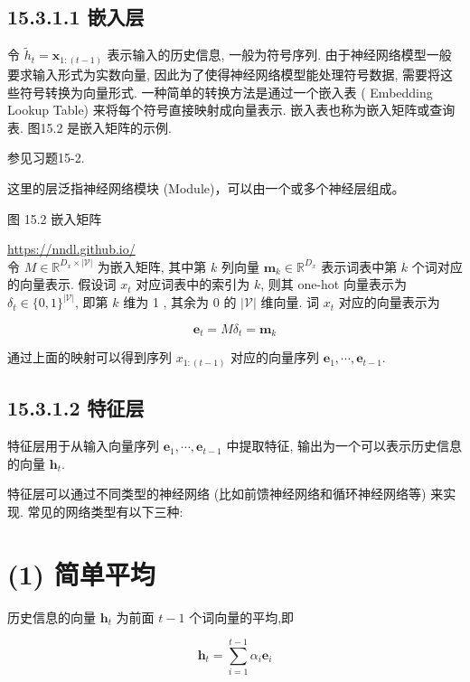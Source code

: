 \documentclass[10pt]{article}
\begin{document}
\subsection*{15.3.1.1 嵌入层}
令 $\tilde{h}_{t}=\boldsymbol{x}_{1:(t-1)}$ 表示输入的历史信息, 一般为符号序列. 由于神经网络模型一般要求输入形式为实数向量, 因此为了使得神经网络模型能处理符号数据, 需要将这些符号转换为向量形式. 一种简单的转换方法是通过一个嵌入表 ( Embedding Lookup Table) 来将每个符号直接映射成向量表示. 嵌入表也称为嵌入矩阵或查询表. 图15.2 是嵌入矩阵的示例.



参见习题15-2.

这里的层泛指神经网络模块 (Module)，可以由一个或多个神经层组成。

图 15.2 嵌入矩阵

\href{https://nndl.github.io/}{https://nndl.github.io/}\\
令 $M \in \mathbb{R}^{D_{x} \times|\mathcal{V}|}$ 为嵌入矩阵, 其中第 $k$ 列向量 $\boldsymbol{m}_{k} \in \mathbb{R}^{D_{x}}$ 表示词表中第 $k$ 个词对应的向量表示. 假设词 $x_{t}$ 对应词表中的索引为 $k$, 则其 one-hot 向量表示为 $\delta_{t} \in\{0,1\}^{|\mathcal{V}|}$, 即第 $k$ 维为 1 , 其余为 0 的 $|\mathcal{V}|$ 维向量. 词 $x_{t}$ 对应的向量表示为


\begin{equation*}
\boldsymbol{e}_{t}=M \delta_{t}=\boldsymbol{m}_{k} \tag{15.23}
\end{equation*}


通过上面的映射可以得到序列 $x_{1:(t-1)}$ 对应的向量序列 $\boldsymbol{e}_{1}, \cdots, \boldsymbol{e}_{t-1}$.

\subsection*{15.3.1.2 特征层}
特征层用于从输入向量序列 $\boldsymbol{e}_{1}, \cdots, \boldsymbol{e}_{t-1}$ 中提取特征, 输出为一个可以表示历史信息的向量 $\boldsymbol{h}_{t}$.

特征层可以通过不同类型的神经网络 (比如前馈神经网络和循环神经网络等) 来实现. 常见的网络类型有以下三种:

\section*{(1) 简单平均}
历史信息的向量 $\boldsymbol{h}_{t}$ 为前面 $t-1$ 个词向量的平均,即


\begin{equation*}
\boldsymbol{h}_{t}=\sum_{i=1}^{t-1} \alpha_{i} \boldsymbol{e}_{i} \tag{15.24}
\end{equation*}
\end{document}
